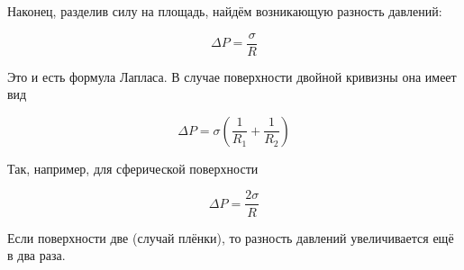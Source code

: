 \noindent
Наконец, разделив силу на площадь, найдём возникающую разность давлений:

\begin{equation}
    \Delta P = \frac{\sigma}{R}
\end{equation}

\noindent
Это и есть формула Лапласа. В случае поверхности двойной кривизны она имеет вид

\begin{equation}
    \Delta P = \sigma \left( \frac{1}{R_1} + \frac{1}{R_2} \right)
\end{equation}

\noindent
Так, например, для сферической поверхности

\begin{equation}
    \Delta P = \frac{2 \sigma}{R}
\end{equation}

\noindent
Если поверхности две (случай плёнки), то разность давлений увеличивается ещё в два раза.